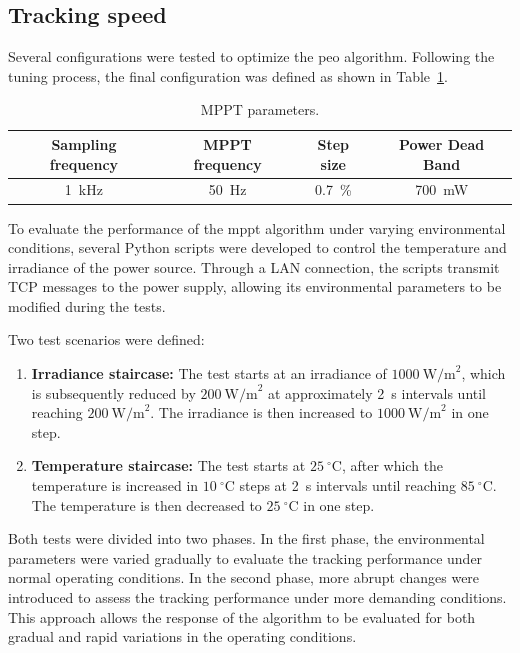     \subsection{Tracking speed}
        Several configurations were tested to optimize the \ac{peo} algorithm. Following the tuning process, the final configuration was defined as shown in Table~\ref{tab:MPPT_config}.

        \begin{table}[!ht]
        \centering
        \caption{MPPT parameters.}
        \label{tab:MPPT_config}
            \begin{tabular}{|c|c|c|c|}
            \hline
            Sampling frequency & MPPT frequency & Step size & Power Dead Band \\
            \hline
            1~kHz & 50~Hz & 0.7~\% & 700~mW \\
            \hline
            \end{tabular}
        \end{table}

        To evaluate the performance of the \ac{mppt} algorithm under varying environmental conditions, several Python scripts were developed to control the temperature and irradiance of the power source. Through a LAN connection, the scripts transmit TCP messages to the power supply, allowing its environmental parameters to be modified during the tests.

        Two test scenarios were defined:

        \begin{enumerate}[leftmargin=4em, itemsep=1pt, topsep=2pt]
            \item \textbf{Irradiance staircase:} The test starts at an irradiance of $1000~\mathrm{W/m}^2$, which is subsequently reduced by $200~\mathrm{W/m}^2$ at approximately 2~s intervals until reaching $200~\mathrm{W/m}^2$. The irradiance is then increased to $1000~\mathrm{W/m}^2$ in one step.

            \item \textbf{Temperature staircase:} The test starts at $25~^\circ\mathrm{C}$, after which the temperature is increased in $10~^\circ\mathrm{C}$ steps at 2~s intervals until reaching $85~^\circ\mathrm{C}$. The temperature is then decreased to $25~^\circ\mathrm{C}$ in one step.
        \end{enumerate}

        Both tests were divided into two phases. In the first phase, the environmental parameters were varied gradually to evaluate the tracking performance under normal operating conditions. In the second phase, more abrupt changes were introduced to assess the tracking performance under more demanding conditions. This approach allows the response of the algorithm to be evaluated for both gradual and rapid variations in the operating conditions.

